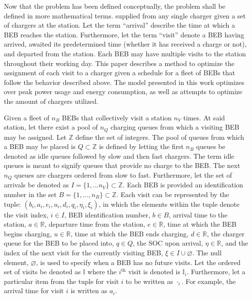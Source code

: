 \documentclass[ee,thesis]{usuthesis}
\newcommand{\visit}{(b_i, a_i, e_i, u_i, d_i, q_i, \eta_i, \xi_i)}
\newcommand{\I}{\mathbb{I}}                 %
\newcommand{\Iset}{I}                       %
\newcommand{\Qset}{Q}                       %
\begin{document}
Now that the problem has been defined conceptually, the problem shall be defined in more mathematical terms.
supplied from any single charger given a set of chargers at the station. Let the term ``arrival'' describe the time at
which a BEB reaches the station. Furthermore, let the term ``visit'' denote a BEB having arrived, awaited its
predetermined time (whether it has received a charge or not), and departed from the station. Each BEB may have multiple
visits to the station throughout their working day. This paper describes a method to optimize the assignment of each
visit to a charger given a schedule for a fleet of BEBs that follow the behavior described above. The model presented in
this work optimizes over peak power usage and energy consumption, as well as attempts to optimize the amount of chargers
utilized.

Given a fleet of \(n_B\) BEBs that collectively visit a station \(n_V\) times. At said station, let there exist a pool of
\(n_Q\) charging queues from which a visiting BEB may be assigned. Let \(\mathbb{Z}\) define the set of integers. The pool of queues
from which a BEB may be placed is \(\Qset \subset \mathbb{Z}\) is defined by letting the first \(n_B\) queues be denoted as idle queues
followed by slow and then fast chargers. The term idle queues is meant to signify queues that provide no charge to the
BEB. The next \(n_Q\) queues are chargers ordered from slow to fast. Furthermore, let the set of arrivals be denoted as
\(\Iset = \{ 1, ... n_V \} \subset \mathbb{Z}\). Each BEB is provided an identification number in the set \(B = \{ 1, ..., n_B \} \subset \mathbb{Z}\).
Each visit can be represented by the tuple: \(\visit\), in which the elements within the tuple denote the visit index, \(i
\in I\), BEB identification number, \(b \in B\), arrival time to the station, \(a \in \mathbb{R}\), departure time from the station, \(e \in
\mathbb{R}\), time at which the BEB begins charging, \(u \in \mathbb{R}\), time at which the BEB ends charging, \(d \in \mathbb{R}\), the charger queue for
the BEB to be placed into, \(q \in Q\), the SOC upon arrival, \(\eta \in \mathbb{R}\), and the index of the next visit for the currently
visiting BEB, \(\xi \in I \cup \varnothing\). The null element, \(\varnothing\), is used to specify when a BEB has no future
visits. Let the ordered set of visits be denoted as \(\I\) where the \(i^{\text{th}}\) visit is denoted is \(\I_i\).
Furthermore, let a particular item from the tuple for visit \(i\) to be written as \(\cdot_i\). For example, the arrival time
for visit \(i\) is written as \(a_i\).
\end{document}
